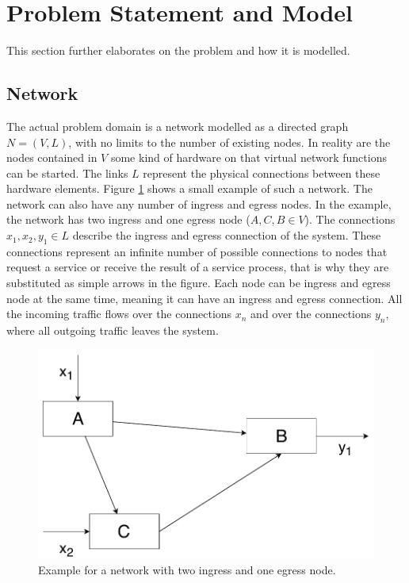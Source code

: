 \section{Problem Statement and Model}
This section further elaborates on the problem and how it is modelled.
\subsection{Network}
The actual problem domain is a network modelled as a directed graph $N = (V,L)$, with no limits to the number of existing nodes.
In reality are the nodes contained in $V$ some kind of hardware on that virtual network functions can be started.
The links $L$ represent the physical connections between these hardware elements.
Figure \ref{fig:networkexample} shows a small example of such a network.
The network can also have any number of ingress and egress nodes.
In the example, the network has two ingress and one egress node ($A,C,B\in V$).
The connections ${x}_{1}, {x}_{2}, {y}_{1} \in L$ describe the ingress and egress connection of the system.
These connections represent an infinite number of possible connections to nodes that request a service or receive the result of a service process, that is why they are substituted as simple arrows in the figure.
Each node can be ingress and egress node at the same time, meaning it can have an ingress and egress connection.
All the incoming traffic flows over the connections ${x}_{n}$ and over the connections ${y}_{n}$, where all outgoing traffic leaves the system.

\begin{figure}[H]
	\centering
	\includegraphics[width=0.6\linewidth]{Pictures/NetworkExample}
	\caption{Example for a network with two ingress and one egress node.}
	\label{fig:networkexample}
\end{figure}

